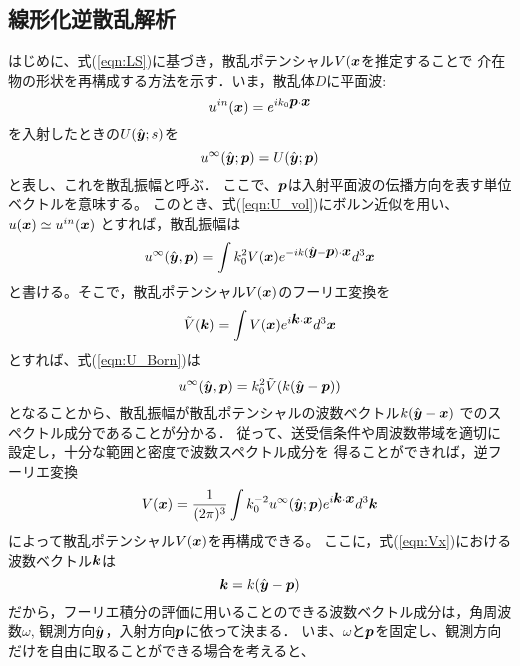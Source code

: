 \documentclass[10pt,a4j,dvipdfmx]{jarticle}
\begin{document}
\subsection{線形化逆散乱解析}
はじめに、式(\ref{eqn:LS})に基づき，散乱ポテンシャル$V(\mbox{\boldmath $x$}$を推定することで
介在物の形状を再構成する方法を示す．いま，散乱体$D$に平面波:
\begin{equation}
	u^{in}(\mbox{\boldmath $x$})= e^{ik_0\mbox{\boldmath $p$}\cdot\mbox{\boldmath $x$}}
	\label{eqn:}
\end{equation}
を入射したときの$U(\hat{\mbox{\boldmath $y$}};s)$を
\begin{equation}
	u^{\infty}(\hat{\mbox{\boldmath $y$}};\mbox{\boldmath $p$})=U(\hat{\mbox{\boldmath $y$}};\mbox{\boldmath $p$})
	\label{eqn:}
\end{equation}
と表し、これを散乱振幅と呼ぶ．
ここで、$\mbox{\boldmath $p$}$は入射平面波の伝播方向を表す単位ベクトルを意味する。
このとき、式(\ref{eqn:U_vol})にボルン近似を用い、$u(\mbox{\boldmath $x$})\simeq u^{in}(\mbox{\boldmath $x$})$
とすれば，散乱振幅は
\begin{equation}
	u^{\infty}(\hat{\mbox{\boldmath $y$}},\mbox{\boldmath $p$})
	=
	\int
	k_0^2 V(\mbox{\boldmath $x$}) e^{-ik(\hat{\mbox{\boldmath $y$}}-\mbox{\boldmath $p$} )\cdot \mbox{\boldmath $x$}}d^3\mbox{\boldmath $x$}
	\label{eqn:U_Born}
\end{equation}
と書ける。そこで，散乱ポテンシャル$V(\mbox{\boldmath $x$})$のフーリエ変換を
\begin{equation}
	\tilde V(\mbox{\boldmath $k$}) = \int V(\mbox{\boldmath $x$}) e^{i\mbox{\boldmath $k$}\cdot \mbox{\boldmath $x$}} d^3\mbox{\boldmath $x$}
	\label{eqn:Vk}
\end{equation}
とすれば、式(\ref{eqn:U_Born})は
\begin{equation}
	u^{\infty}(\hat{\mbox{\boldmath $y$}},\mbox{\boldmath $p$}) =k_0^2 \tilde V (
	k(\hat{\mbox{\boldmath $y$}}-\mbox{\boldmath $p$} )
	)
	\label{eqn:}
\end{equation}
となることから、散乱振幅が散乱ポテンシャルの波数ベクトル$k(\hat{\mbox{\boldmath $y$}}-\mbox{\boldmath $x$})$
でのスペクトル成分であることが分かる．
従って、送受信条件や周波数帯域を適切に設定し，十分な範囲と密度で波数スペクトル成分を
得ることができれば，逆フーリエ変換
\begin{equation}
	V(\mbox{\boldmath $x$}) =\frac{1}{(2\pi)^3} \int k_0^{-2} u^{\infty}(\hat{\mbox{\boldmath $y$}};\mbox{\boldmath $p$}) 
	e^{i\mbox{\boldmath $k$}\cdot \mbox{\boldmath $x$}}d^3\mbox{\boldmath $k$}
	\label{eqn:Vx}
\end{equation}
によって散乱ポテンシャル$V(\mbox{\boldmath $x$})$を再構成できる。
ここに，式(\ref{eqn:Vx})における波数ベクトル$\mbox{\boldmath $k$}$は
\begin{equation}
	\mbox{\boldmath $k$}=k(\hat{\mbox{\boldmath $y$}}-\mbox{\boldmath $p$})
	\label{eqn:}
\end{equation}
だから，フーリエ積分の評価に用いることのできる波数ベクトル成分は，角周波数$\omega$,
観測方向$\hat{\mbox{\boldmath $y$}}$，入射方向$\mbox{\boldmath $p$}$に依って決まる．
いま、$\omega$と$\mbox{\boldmath $p$}$を固定し、観測方向だけを自由に取ることができる場合を考えると、
\end{document}
